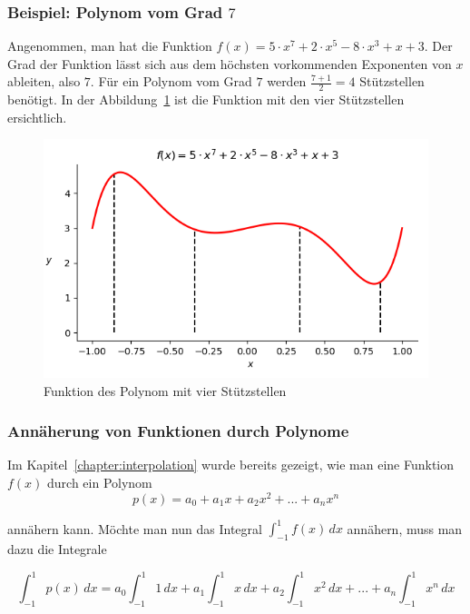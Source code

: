 \subsubsection{Beispiel: Polynom vom Grad $7$}
Angenommen, man hat die Funktion $f(x) = 5 \cdot x^{7} + 2 \cdot x^{5} - 8 \cdot x^{3} + x + 3$.
Der Grad der Funktion lässt sich aus dem höchsten vorkommenden Exponenten von $x$ ableiten,
also $7$.
Für ein Polynom vom Grad $7$ werden $\frac{7+1}{2} = 4$ Stützstellen benötigt.
In der Abbildung~\ref{quadratur:figure:polynom} ist die Funktion mit den vier 
Stützstellen ersichtlich.

\begin{figure}
    \centering
    \includegraphics[scale=0.7]{papers/quadratur/figures/polynom.png}
    \caption{ Funktion des Polynom mit vier Stützstellen
    \label{quadratur:figure:polynom}}
\end{figure}

\subsubsection{Annäherung von Funktionen durch Polynome}
Im Kapitel~\ref{chapter:interpolation} wurde bereits gezeigt, 
wie man eine Funktion $f(x)$ durch ein Polynom 
\begin{equation}
    p(x) = a_{0} + a_{1}x + a_{2}x^{2} + ... + a_{n}x^{n}
\end{equation}

annähern kann. Möchte man nun das Integral $\int_{-1}^{1} f(x) \, dx$ annähern, 
muss man dazu die Integrale 

\begin{equation}
    \int_{-1}^{1} p(x)\,dx 
    =
    a_{0} \int_{-1}^{1} 1\,dx
    +
    a_{1}\int_{-1}^{1} x\,dx 
    + 
    a_{2}\int_{-1}^{1} x^{2} \,dx  
    +
    ... 
    +
    a_{n}\int_{-1}^{1} x^{n}\,dx 
\end{equation}

